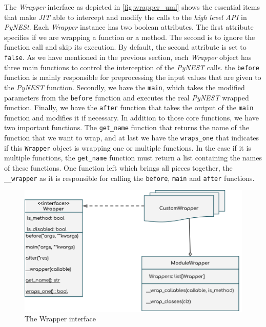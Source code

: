 The \emph{Wrapper} interface as depicted in \autoref{fig:wrapper_uml} shows the essential items that make \emph{JIT} able to intercept and modify the calls to the \emph{high level API} in \emph{PyNESt}. Each \emph{Wrapper} instance has two boolean attributes. The first attribute specifies if we are wrapping a function or a method. The second is to ignore the function call and skip its execution. By default, the second attribute is set to \texttt{false}. As we have mentioned in the previous section, each \emph{Wrapper} object has three main functions to control the interception of the \emph{PyNEST} calls. the \texttt{before} function is mainly responsible for preprocessing the input values that are given to the \emph{PyNEST} function. Secondly, we have the \texttt{main}, which takes the modified parameters from the \texttt{before} function and executes the real \emph{PyNEST} wrapped function. Finally, we have the \texttt{after} function that takes the output of the \texttt{main} function and modifies it if necessary. In addition to those core functions, we have two important functions. The \texttt{get\_name} function that returns the name of the function that we want to wrap, and at last we have the \texttt{wraps\_one} that indicates if this \texttt{Wrapper} object is wrapping one or multiple functions. In the case if it is multiple functions, the \texttt{get\_name} function must return a list containing the names of these functions. One function left which brings all pieces together, the \texttt{\_\_wrapper} as it is responsible for calling the \texttt{before}, \texttt{main} and \texttt{after} functions.


\begin{figure}[ht!]
\centering
\includegraphics[width=\textwidth,height=\textheight,keepaspectratio]{src/pic/wrapper_uml.png}
\caption{The Wrapper interface}
\label{fig:wrapper_uml}
\end{figure}

